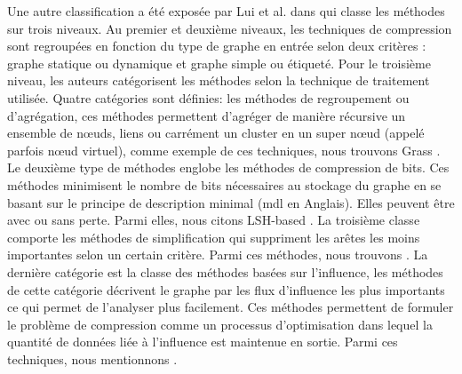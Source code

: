 Une autre classification a été exposée par Lui et al. dans \citep{liu2018graph} qui classe les méthodes sur trois niveaux. Au premier et deuxième niveaux, les techniques de compression sont regroupées en fonction du type de graphe en entrée selon deux critères : graphe statique ou dynamique et graphe simple ou étiqueté. Pour le troisième niveau, les auteurs catégorisent les méthodes selon la technique de traitement utilisée. Quatre catégories sont définies: les méthodes de regroupement ou d'agrégation, ces méthodes permettent d'agréger de manière récursive un ensemble de nœuds, liens ou carrément un cluster en un super nœud (appelé parfois nœud virtuel), comme exemple de ces techniques, nous trouvons Grass \citep{lefevre2010grass}. Le deuxième type de méthodes englobe les méthodes de compression de bits. Ces méthodes minimisent le nombre de bits nécessaires au stockage du graphe en se basant sur 
le principe de description minimal (\gls{mdl} en Anglais). Elles peuvent être avec ou sans perte. Parmi elles, nous citons LSH-based \citep{khan2014set}. La troisième classe comporte les méthodes de simplification qui suppriment les arêtes les moins importantes selon un certain critère. Parmi ces méthodes, nous trouvons \citep{shen2006visual}. La dernière catégorie est la classe des méthodes basées sur l'influence, les méthodes de cette catégorie décrivent le graphe par les flux d'influence les plus importants ce qui permet de l'analyser plus facilement. Ces méthodes permettent de formuler le problème de compression comme un processus d'optimisation dans lequel la quantité de données liée à l'influence est maintenue en sortie. Parmi ces techniques, nous mentionnons \citep{shi2015vegas}.\\


